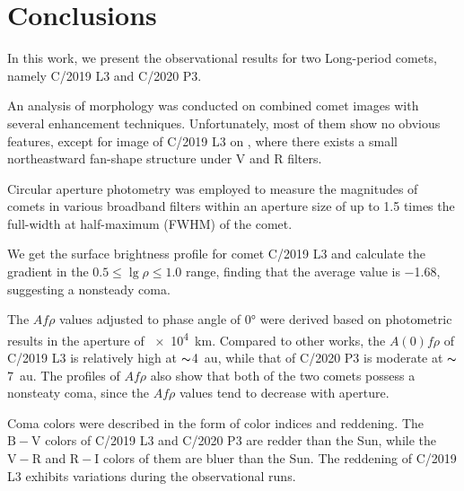 \section{Conclusions} \label{sec:con}
In this work, we present the observational results for two Long-period comets, namely C/2019 L3 and C/2020 P3. 

An analysis of morphology was conducted on combined comet images with several enhancement techniques. Unfortunately, most of them show no obvious features, except for image of C/2019 L3 on , where there exists a small northeastward fan-shape structure under V and R filters. 

Circular aperture photometry was employed to measure the magnitudes of comets in various broadband filters within an aperture size of up to 1.5 times the full-width at half-maximum (FWHM) of the comet. 

We get the surface brightness profile for comet C/2019 L3 and calculate the gradient in the $0.5 \leqslant \lg{\rho} \leqslant 1.0$ range, finding that the average value is \num{-1.68}, suggesting a nonsteady coma. 

The $Af\rho$ values adjusted to phase angle of \ang{0} were derived based on photometric results in the aperture of \SI{e4}{\km}. Compared to other works, the $A(0)f\rho$ of C/2019 L3 is relatively high at $\thicksim${\SI{4}{\astronomicalunit}}, while that of C/2020 P3 is moderate at $\thicksim${\SI{7}{\astronomicalunit}}. The profiles of $Af\rho$ also show that both of the two comets possess a nonsteaty coma, since the $Af\rho$ values tend to decrease with aperture. 

Coma colors were described in the form of color indices and reddening. The $\mathrm{B} - \mathrm{V}$ colors of C/2019 L3 and C/2020 P3 are redder than the Sun, while the $\mathrm{V} - \mathrm{R}$ and $\mathrm{R} - \mathrm{I}$ colors of them are bluer than the Sun. The reddening of C/2019 L3 exhibits variations during the observational runs. 

